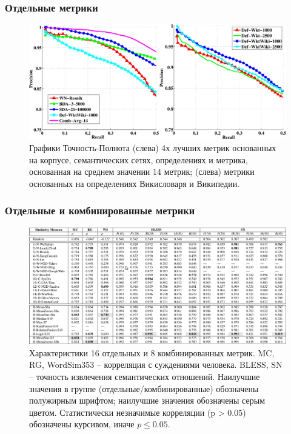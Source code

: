 \documentclass{beamer}
\begin{document}
\begin{frame}
\frametitle{Отдельные метрики }

	\begin{figure}
	\centering
		\includegraphics[width=1.0\textwidth]{figures/pr-plots-2}
			\caption{Графики Точность-Полнота (слева) 4х лучших метрик основанных на корпусе, семантических сетях, определениях и метрика, основанная на среднем значении 14 метрик; (слева) метрики основанных на определениях Викисловаря и Википедии. }
\end{figure}
	
\end{frame}


\begin{frame}
\frametitle{Отдельные и комбинированные метрики }


	\begin{figure}
	\centering
		\includegraphics[width=1.0\textwidth]{figures/table-hybrid}
		\caption{
		\footnotesize
		Характеристики 16 отдельных и 8 комбинированных метрик. MC, RG, WordSim353 -- корреляция с суждениями человека. BLESS, SN -- точность извлечения семантических отношений. Наилучшие значения в группе (отдельные/комбинированные) обозначены полужирным шрифтом; наилучшие значения  обозначены серым цветом. Статистически незначимые корреляции (p > 0.05) обозначены курсивом, иначе $p \leq 0.05$.}
\end{figure}
	
\end{frame}
\end{document}
